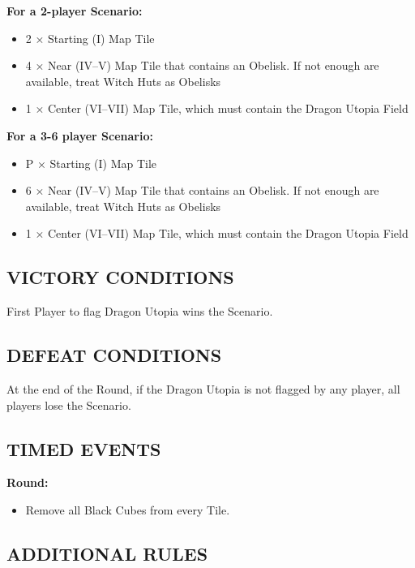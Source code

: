 \begin{multicols}{2}
\textbf{For a 2-player Scenario:}
\begin{itemize}
  \item 2 × Starting (I) Map Tile
  \item 4 × Near (IV--V) Map Tile that contains an Obelisk. If not enough are available, treat Witch Huts as Obelisks
  \item 1 × Center (VI--VII) Map Tile, which must contain the Dragon Utopia Field
\end{itemize}

\textbf{For a 3-6 player Scenario:}
\begin{itemize}
  \item P × Starting (I) Map Tile
  \item 6 × Near (IV--V) Map Tile that contains an Obelisk. If not enough are available, treat Witch Huts as Obelisks
  \item 1 × Center (VI--VII) Map Tile, which must contain the Dragon Utopia Field
\end{itemize}

\subsection*{\MakeUppercase{Victory Conditions}}
First Player to flag Dragon Utopia wins the Scenario.

\subsection*{\MakeUppercase{Defeat Conditions}}
At the end of the  Round, if the Dragon Utopia is not flagged by any player, all players lose the Scenario.

\begin{center}
\end{center}

\subsection*{\MakeUppercase{Timed Events}}

\textbf{ Round:}
\begin{itemize}
  \item Remove all Black Cubes from every Tile.
\end{itemize}

\subsection*{\MakeUppercase{Additional Rules}}


\end{multicols}
